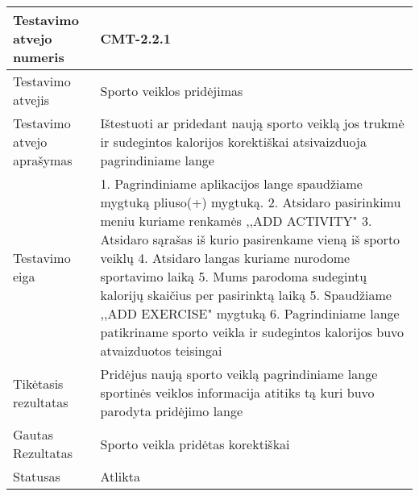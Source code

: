 \documentclass[oneside]{VUMIFPSkursinis}
\begin{document}
\begin{center}
    \begin{tabular}{ |p{5cm}|p{13cm}|}
    \hline
    	Testavimo atvejo numeris & CMT-2.2.1\\ \hline
    	Testavimo atvejis & Sporto veiklos pridėjimas \\ \hline
	Testavimo atvejo aprašymas & Ištestuoti ar pridedant naują sporto veiklą jos trukmė ir sudegintos kalorijos korektiškai atsivaizduoja pagrindiniame lange    \\ \hline
	Testavimo eiga &1. Pagrindiniame aplikacijos lange spaudžiame mygtuką pliuso(+) mygtuką. 
				2. Atsidaro pasirinkimu meniu kuriame renkamės ,,ADD ACTIVITY"
				3. Atsidaro sąrašas iš kurio pasirenkame vieną iš sporto veiklų
				4. Atsidaro langas kuriame nurodome sportavimo laiką
				5. Mums parodoma sudegintų kalorijų skaičius per pasirinktą laiką
				5. Spaudžiame ,,ADD EXERCISE"  mygtuką
				6. Pagrindiniame lange patikriname sporto veikla ir sudegintos kalorijos buvo atvaizduotos teisingai\\ \hline
	Tikėtasis rezultatas &  Pridėjus naują sporto veiklą pagrindiniame lange sportinės veiklos informacija atitiks tą kuri buvo parodyta pridėjimo lange\\ \hline
	Gautas Rezultatas & Sporto veikla pridėtas korektiškai  \\ \hline
	Statusas &  Atlikta\\ \hline
    \hline
    \end{tabular}
\end{center}
\end{document}
